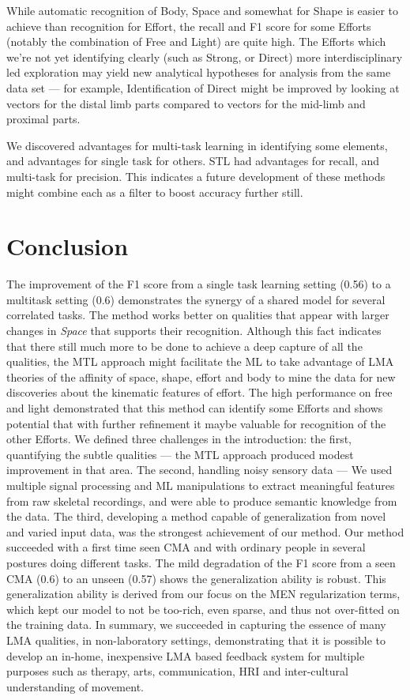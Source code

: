 \documentclass[11pt,twocolumn,varwidth=true,a4paper,fleqn]{sigchi}
\begin{document}
While automatic recognition of Body, Space and somewhat for Shape is easier to achieve than recognition for Effort, the recall and F1 score for some Efforts (notably the combination of Free and Light) are quite high.  The Efforts which we're not yet identifying clearly (such as Strong, or Direct) more interdisciplinary led exploration may yield new analytical hypotheses for analysis from the same data set --- for example,  Identification of Direct might be improved by looking at vectors for the distal limb parts compared to vectors for the mid-limb and proximal parts. 

We discovered advantages for multi-task learning in identifying some elements, and advantages for single task for others. STL had advantages for recall, and multi-task for precision. This indicates a future development of these methods might combine each as a filter to boost accuracy further still.

\section{Conclusion}
The improvement of the F1 score from a single task learning setting (0.56) to a multitask setting (0.6) demonstrates the synergy of a shared model for several correlated tasks. 
The method works better on qualities that appear with larger changes in \textit{Space} that supports their recognition. 
Although this fact indicates that there still much more to be done to achieve a deep capture of all the qualities, the MTL approach might facilitate the ML to take advantage of LMA theories of the affinity of space, shape, effort and body to mine the data for new discoveries about the kinematic features of effort.  
The high performance on free and light demonstrated that this method can identify some Efforts and shows potential that with further refinement it maybe valuable for recognition of the other Efforts. 
We defined  three challenges in the introduction: the first, quantifying the subtle qualities --- 
the MTL approach produced modest improvement in that area.
The second, handling noisy sensory data --- We used multiple signal processing and ML manipulations to extract meaningful features from raw skeletal recordings, and were able to produce semantic knowledge from the data. 
The third, developing a method capable  of generalization from novel and varied input data, was the strongest achievement of our method. Our method succeeded with a first time seen CMA and with ordinary people in several postures doing different tasks. 
The mild degradation of the F1 score from a seen CMA (0.6) to an unseen (0.57) shows the generalization ability is robust.
This generalization ability is derived from our focus on the MEN regularization terms, which kept our model to not be too-rich, even sparse, and thus not over-fitted on the training data.
In summary, we succeeded in capturing the essence of many LMA qualities, in non-laboratory settings, demonstrating that it is possible to develop an in-home, inexpensive LMA based feedback system for multiple purposes such as therapy, arts, communication, HRI and inter-cultural understanding of movement.


\end{document}
